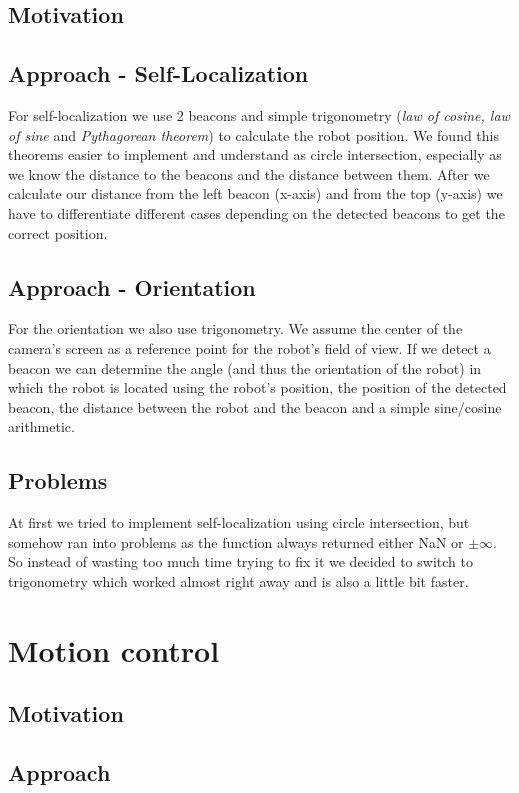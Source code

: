 \documentclass[703031]{iisreport}
\begin{document}
\subsection{Motivation}

\subsection{Approach - Self-Localization}
For self-localization we use 2 beacons and simple trigonometry (\emph{law of cosine, law of sine} and \emph{Pythagorean theorem}) to calculate the robot position. We found this theorems easier to implement and understand as circle intersection, especially as we know the distance to the beacons and the distance between them. After we calculate our distance from the left beacon (x-axis) and from the top (y-axis) we have to differentiate different cases depending on the detected beacons to get the correct position.

\subsection{Approach - Orientation}
For the orientation we also use trigonometry. We assume the center of the camera's screen as a reference point for the robot's field of view. If we detect a beacon we can determine the angle (and thus the orientation of the robot) in which the robot is located using the robot's position, the position of the detected beacon, the distance between the robot and the beacon and a simple sine/cosine arithmetic.

\subsection{Problems}
At first we tried to implement self-localization using circle intersection, but somehow ran into problems as the function always returned either NaN or $\pm \infty$. So instead of wasting too much time trying to fix it we decided to switch to trigonometry which worked almost right away and is also a little bit faster.

\section{Motion control}
\subsection{Motivation}

\subsection{Approach}
\end{document}
